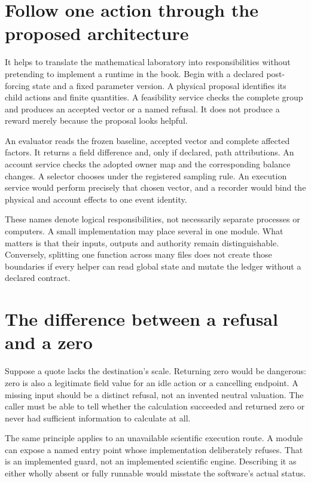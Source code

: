 \section{Follow one action through the proposed architecture}
It helps to translate the mathematical laboratory into responsibilities
without pretending to implement a runtime in the book. Begin with a
declared post-forcing state and a fixed parameter version. A physical
proposal identifies its child actions and finite quantities. A feasibility
service checks the complete group and produces an accepted vector or a
named refusal. It does not produce a reward merely because the proposal
looks helpful.

An evaluator reads the frozen baseline, accepted vector and complete
affected factors. It returns a field difference and, only if declared,
path attributions. An account service checks the adopted owner map and
the corresponding balance changes. A selector chooses under the registered
sampling rule. An execution service would perform precisely that chosen
vector, and a recorder would bind the physical and account effects to
one event identity.

These names denote logical responsibilities, not necessarily separate
processes or computers. A small implementation may place several in one
module. What matters is that their inputs, outputs and authority remain
distinguishable. Conversely, splitting one function across many files
does not create those boundaries if every helper can read global state
and mutate the ledger without a declared contract.

\section{The difference between a refusal and a zero}
Suppose a quote lacks the destination's scale. Returning zero would be
dangerous: zero is also a legitimate field value for an idle action or
a cancelling endpoint. A missing input should be a distinct refusal, not
an invented neutral valuation. The caller must be able to tell whether
the calculation succeeded and returned zero or never had sufficient
information to calculate at all.

The same principle applies to an unavailable scientific execution route.
A module can expose a named entry point whose implementation deliberately
refuses. That is an implemented guard, not an implemented scientific
engine. Describing it as either wholly absent or fully runnable would
misstate the software's actual status.

